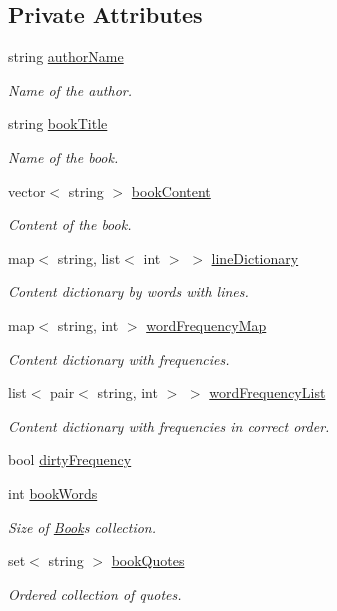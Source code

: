 \subsection*{Private Attributes}
\begin{DoxyCompactItemize}
\item 
string \hyperlink{class_book_a0dcb8f78ffb56c34e28f5d672b422e2a}{author\+Name}
\begin{DoxyCompactList}\small\item\em Name of the author. \end{DoxyCompactList}\item 
string \hyperlink{class_book_a111d7b30bddd6166bd09764f050cfee3}{book\+Title}
\begin{DoxyCompactList}\small\item\em Name of the book. \end{DoxyCompactList}\item 
vector$<$ string $>$ \hyperlink{class_book_a62ca3f4431b699fa41384c8bab7ef4fa}{book\+Content}
\begin{DoxyCompactList}\small\item\em Content of the book. \end{DoxyCompactList}\item 
map$<$ string, list$<$ int $>$ $>$ \hyperlink{class_book_a7da5c2f5239458c2ab88576cac8d0a10}{line\+Dictionary}
\begin{DoxyCompactList}\small\item\em Content dictionary by words with lines. \end{DoxyCompactList}\item 
map$<$ string, int $>$ \hyperlink{class_book_a18b73c8d2b492cad5b7b0c187b08dfc0}{word\+Frequency\+Map}
\begin{DoxyCompactList}\small\item\em Content dictionary with frequencies. \end{DoxyCompactList}\item 
list$<$ pair$<$ string, int $>$ $>$ \hyperlink{class_book_aa9035db1c21cf61eb3af84ad69829069}{word\+Frequency\+List}
\begin{DoxyCompactList}\small\item\em Content dictionary with frequencies in correct order. \end{DoxyCompactList}\item 
bool \hyperlink{class_book_ad1df1050750f0605efdfab51b86c0765}{dirty\+Frequency}
\item 
int \hyperlink{class_book_a36f1e0b30a0ad17606976556cab45a23}{book\+Words}
\begin{DoxyCompactList}\small\item\em Size of \hyperlink{class_book}{Book}\textquotesingle{}s collection. \end{DoxyCompactList}\item 
set$<$ string $>$ \hyperlink{class_book_a370478eab144c20de936e1b68923e1c0}{book\+Quotes}
\begin{DoxyCompactList}\small\item\em Ordered collection of quotes. \end{DoxyCompactList}\end{DoxyCompactItemize}


